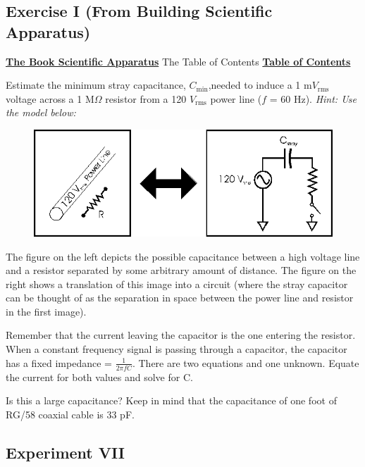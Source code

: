 \documentclass{../lab}
\begin{document}
\subsection{Exercise I (From Building Scientific Apparatus)}

\href{http://physics111.lib.berkeley.edu/Physics111/Reprints/Apparatus\%20Book/Building-Scientific-Apparatus--Moore.pdf}{\textbf{The Book Scientific Apparatus}} The Table of Contents \href{http://physics111.lib.berkeley.edu/Physics111/Reprints/Apparatus\%20Book/toc.pdf}{\textbf{Table of Contents}}

Estimate the minimum stray capacitance, $C_\text{min}$,needed to induce a 1 m$V_\text{rms}$ voltage across a 1 M$\Omega$ resistor from a 120 $V_\text{rms}$ power line ($f$ = 60 Hz). \emph{Hint: Use the model below:}

\begin{figure}[h]
    \centering
    \href{http://experimentationlab.berkeley.edu/sites/default/files/images/LLSimage022.gif}{\includegraphics[width=0.5\linewidth]{images/LLSimage022.png}}
    \caption{}
    \label{fig:LLSimage022}
\end{figure}

The figure on the left depicts the possible capacitance between a high voltage line and a resistor separated by some arbitrary amount of distance. The figure on the right shows a translation of this image into a circuit (where the stray capacitor can be thought of as the separation in space between the power line and resistor in the first image).

Remember that the current leaving the capacitor is the one entering the resistor. When a constant frequency signal is passing through a capacitor, the capacitor has a fixed impedance = $\frac{1}{2 \pi f C}$. There are two equations and one unknown. Equate the current for both values and solve for C.

Is this a large capacitance? Keep in mind that the capacitance of one foot of RG/58 coaxial cable is 33 pF.

\subsection{Experiment VII}
\end{document}
